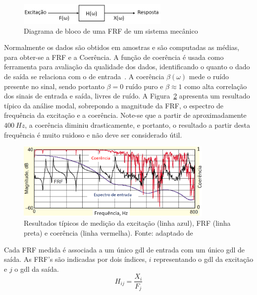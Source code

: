 \begin{figure}[h]
	\centering 
 	\includegraphics[width=0.65\textwidth]{figs/diagrama_frf}
 	\caption{Diagrama de bloco de uma FRF de um sistema mecânico}
 	\label{fig::diagrama_frf}
\end{figure}

Normalmente os dados são obtidos em amostras e são computadas as médias, para
obter-se a FRF e a Coerência. A função de coerência é usada como
ferramenta para avaliação da qualidade dos dados, identificando o quanto o dado de saída se
relaciona com o de entrada~\cite{avitabile2001experimental}. A coerência
$\beta(\omega)$ mede o ruído presente no sinal, sendo portanto $\beta = 0$ ruído
puro e $\beta \approx 1$ como alta correlação dos sinais de entrada e saída,
livres de ruído. A Figura~\ref{fig::coerencia} apresenta um resultado típico da
análise modal, sobrepondo a magnitude da FRF, o espectro de frequência da
excitação e a coerência. Note-se que a partir de aproximadamente $400~Hz$, a
coerência diminiu drasticamente, e portanto, o resultado a partir desta
frequência é muito ruidoso e não deve ser considerado útil.

\begin{figure}[h]
	\centering 
 	\includegraphics[width=0.85\textwidth]{figs/coerencia}
 	\caption[Resultados típicos de medição da excitação, FRF e
 	coerência]{Resultados típicos de medição da excitação (linha azul), FRF
 	(linha preta) e coerência (linha vermelha).	Fonte: adaptado de
 	\cite{avitabile2001experimental}}
 	\label{fig::coerencia}
\end{figure}

Cada FRF medida é associada a um único gdl de entrada com um único gdl de saída.
As FRF's são indicadas por dois índices, $i$ representando o gdl da excitação e
$j$ o gdl da saída.
%
\begin{equation}
	H_{ij} = \frac{X_i}{F_j}
\end{equation}

